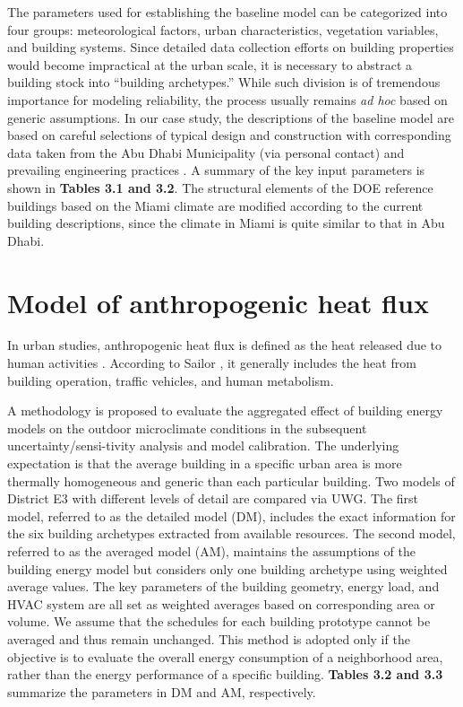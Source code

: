 The parameters used for establishing the baseline model can be categorized into four groups: meteorological factors, urban characteristics, vegetation variables, and building systems. Since detailed data collection efforts on building properties would become impractical at the urban scale, it is necessary to abstract a building stock into ``building archetypes.'' While such division is of tremendous importance for modeling reliability, the process usually remains \textit{ad hoc} based on generic assumptions. In our case study, the descriptions of the baseline model are based on careful selections of typical design and construction with corresponding data taken from the Abu Dhabi Municipality (via personal contact) and prevailing engineering practices \cite{martin2015estimation,bueno2013urban,bueno2014computationally,bueno2013calculation,deru2011us,radhi2009evaluating,afshari2014life}. A summary of the key input parameters is shown in \textbf{Tables 3.1 and 3.2}. The structural elements of the DOE reference buildings based on the Miami climate are modified according to the current building descriptions, since the climate in Miami is quite similar to that in Abu Dhabi.

\section{Model of anthropogenic heat flux}

In urban studies, anthropogenic heat flux is defined as the heat released due to human activities \cite{oke2002boundary}. According to Sailor \cite{sailor2011review}, it generally includes the heat from building operation, traffic vehicles, and human metabolism.

A methodology is proposed to evaluate the aggregated effect of building energy models on the outdoor microclimate conditions in the subsequent uncertainty/sensi-tivity analysis and model calibration. The underlying expectation is that the average building in a specific urban area is more thermally homogeneous and generic than each particular building. Two models of District E3 with different levels of detail are compared via UWG. The first model, referred to as the detailed model (DM), includes the exact information for the six building archetypes extracted from available resources. The second model, referred to as the averaged model (AM), maintains the assumptions of the building energy model but considers only one building archetype using weighted average values. The key parameters of the building geometry, energy load, and HVAC system are all set as weighted averages based on corresponding area or volume. We assume that the schedules for each building prototype cannot be averaged and thus remain unchanged. This method is adopted only if the objective is to evaluate the overall energy consumption of a neighborhood area, rather than the energy performance of a specific building. \textbf{Tables 3.2 and 3.3} summarize the parameters in DM and AM, respectively.

